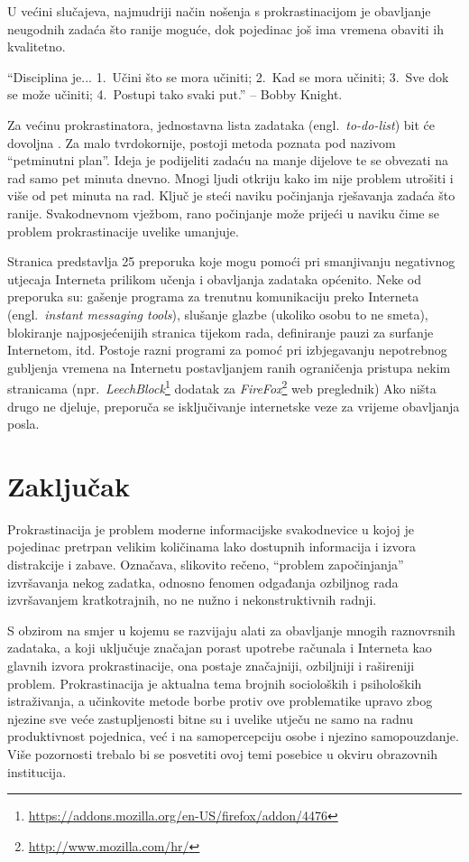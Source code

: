 \documentclass[11pt,english]{article}
\newcommand{\engl}[1]{(engl.~\emph{#1})}
\begin{document}
\begin{multicols}{2}
U većini slučajeva, najmudriji način nošenja s prokrastinacijom je obavljanje
neugodnih zadaća što ranije moguće, dok pojedinac još ima vremena obaviti ih kvalitetno.

``Disciplina je... 1.~Učini što se mora učiniti; 2.~Kad se mora učiniti; 3.~Sve
dok se može učiniti; 4.~Postupi tako svaki put.'' -- Bobby Knight.  

Za većinu prokrastinatora, jednostavna lista zadataka \engl{to-do-list}
bit će dovoljna \cite{TuckerPsySelfHelp}. Za malo tvrdokornije, postoji metoda
poznata pod nazivom ``petminutni plan''. Ideja je podijeliti zadaću na manje
dijelove te se obvezati na rad samo pet minuta dnevno. Mnogi ljudi otkriju kako
im nije problem utrošiti i više od pet minuta na rad. Ključ je steći naviku
počinjanja rješavanja zadaća što ranije. Svakodnevnom vježbom, rano počinjanje
može prijeći u naviku čime se problem prokrastinacije uvelike umanjuje.

Stranica \cite{ColDeg25ways} predstavlja 25 preporuka koje mogu pomoći pri
smanjivanju negativnog utjecaja Interneta prilikom učenja i obavljanja zadataka
općenito. Neke od preporuka su: gašenje programa za trenutnu komunikaciju preko
Interneta \engl{instant messaging tools}, slušanje glazbe (ukoliko osobu to ne
smeta), blokiranje najposjećenijih stranica tijekom rada, definiranje pauzi za
surfanje Internetom, itd. Postoje razni programi za pomoć pri izbjegavanju
nepotrebnog gubljenja vremena na Internetu postavljanjem ranih ograničenja
pristupa nekim stranicama
(npr.~\emph{LeechBlock}\footnote{\url{https://addons.mozilla.org/en-US/firefox/addon/4476}}
dodatak za \emph{FireFox}\footnote{\url{http://www.mozilla.com/hr/}} web
preglednik) Ako ništa drugo ne djeluje, preporuča se isključivanje internetske
veze za vrijeme obavljanja posla.


\section{Zaključak}

Prokrastinacija je problem moderne informacijske svakodnevice u kojoj 
je pojedinac pretrpan velikim količinama lako dostupnih  informacija i 
izvora distrakcije i zabave. Označava, slikovito rečeno, ``problem započinjanja'' 
izvršavanja nekog zadatka, odnosno fenomen odgađanja ozbiljnog rada 
izvršavanjem kratkotrajnih, no ne nužno i nekonstruktivnih radnji. 

S obzirom na smjer u kojemu se razvijaju alati za obavljanje mnogih raznovrsnih 
zadataka, a koji uključuje značajan porast upotrebe računala i Interneta kao glavnih 
izvora prokrastinacije, ona postaje značajniji, ozbiljniji i rašireniji
problem. Prokrastinacija je aktualna tema brojnih socioloških i psiholoških 
istraživanja, a učinkovite metode borbe protiv ove problematike upravo zbog 
njezine sve veće zastupljenosti bitne su i uvelike utječu ne samo na radnu produktivnost 
pojednica, već i na samopercepciju osobe i njezino samopouzdanje. Više pozornosti 
trebalo bi se posvetiti ovoj temi posebice u okviru obrazovnih institucija.



\end{multicols}
\end{document}
